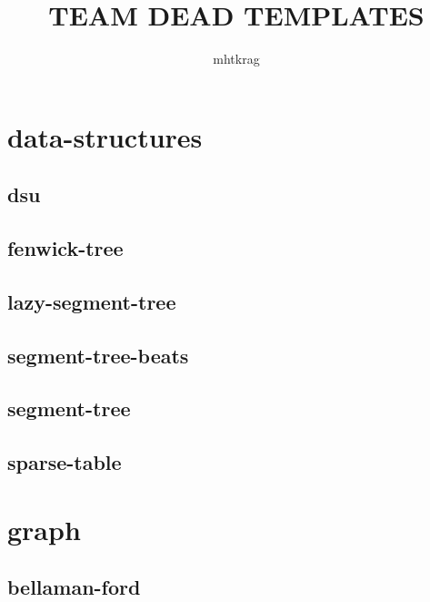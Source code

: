 \documentclass[a4paper, twocolumn]{article}
\title{TEAM DEAD TEMPLATES}
\author{mhtkrag}
\begin{document}
\begin{titlepage}
\maketitle
\thispagestyle{empty}
\pagebreak
\pagestyle{fancy}
\lhead{}
\rhead{}
\cfoot{}
\tableofcontents
\end{titlepage}

\pagestyle{fancy}
\cfoot{- \thepage \ -}
  
\section{data-structures}
\subsection{dsu}

\subsection{fenwick-tree}

\subsection{lazy-segment-tree}

\subsection{segment-tree-beats}

\subsection{segment-tree}

\subsection{sparse-table}

\section{graph}
\subsection{bellaman-ford}

\end{document}
